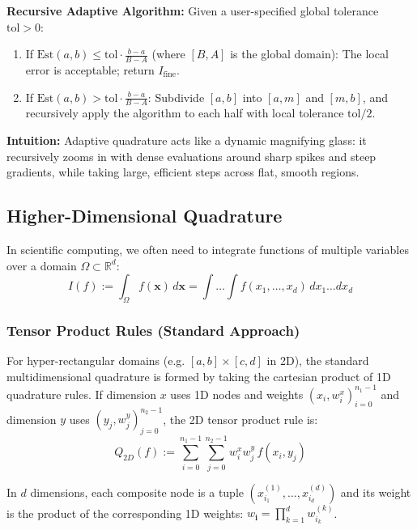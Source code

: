 \begin{definition}
    \textbf{Recursive Adaptive Algorithm:} Given a user-specified global tolerance $\text{tol} > 0$:
    \begin{enumerate}
        \item If $\text{Est}(a, b) \le \text{tol} \cdot \frac{b-a}{B-A}$ (where $[B, A]$ is the global domain):
        The local error is acceptable; return $I_{\text{fine}}$.
        \item If $\text{Est}(a, b) > \text{tol} \cdot \frac{b-a}{B-A}$:
        Subdivide $[a, b]$ into $[a, m]$ and $[m, b]$, and recursively apply the algorithm to each half with local tolerance $\text{tol}/2$.
    \end{enumerate}
\end{definition}

\begin{remark}
    \textbf{Intuition:} Adaptive quadrature acts like a dynamic magnifying glass: it recursively zooms in with dense evaluations around sharp spikes and steep gradients, while taking large, efficient steps across flat, smooth regions.
\end{remark}

\subsection{Higher-Dimensional Quadrature}

In scientific computing, we often need to integrate functions of multiple variables over a domain $\Omega \subset \mathbb{R}^d$:
$$I(f) := \int_{\Omega} f(\mathbf{x}) \, d\mathbf{x} = \int \dots \int f(x_1, \dots, x_d) \, dx_1 \dots dx_d$$

\subsubsection{Tensor Product Rules (Standard Approach)}

\begin{theorem}
    For hyper-rectangular domains (e.g. $[a, b] \times [c, d]$ in 2D), the standard multidimensional quadrature is formed by taking the cartesian product of 1D quadrature rules.
    If dimension $x$ uses 1D nodes and weights $(x_i, w_i^x)_{i=0}^{n_1-1}$ and dimension $y$ uses $(y_j, w_j^y)_{j=0}^{n_2-1}$, the 2D tensor product rule is:
    $$Q_{2D}(f) := \sum_{i=0}^{n_1-1} \sum_{j=0}^{n_2-1} w_i^x w_j^y \, f(x_i, y_j)$$
\end{theorem}

\begin{remark}
    In $d$ dimensions, each composite node is a tuple $(x_{i_1}^{(1)}, \dots, x_{i_d}^{(d)})$ and its weight is the product of the corresponding 1D weights: $w_{\mathbf{i}} = \prod_{k=1}^d w_{i_k}^{(k)}$.
\end{remark}

